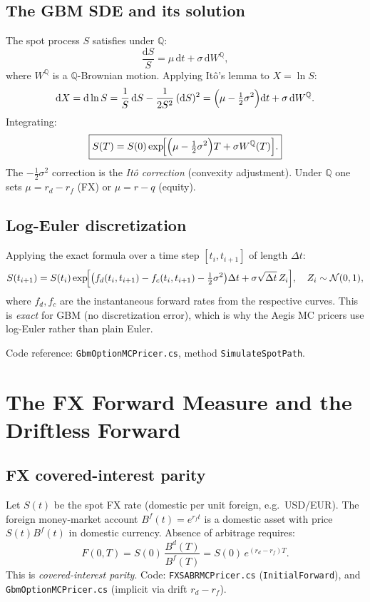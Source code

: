 \documentclass[11pt,a4paper]{article}
\newcommand{\dd}{\mathrm{d}}
\newcommand{\Q}{\mathbb{Q}}
\newcommand{\N}{\mathcal{N}}
\newcommand{\coderef}[1]{\texttt{\color{blue!60!black}#1}}
\theoremstyle{definition}
\begin{document}
\subsection{The GBM SDE and its solution}

The spot process $S$ satisfies under $\Q$:
\[
  \frac{\dd S}{S} = \mu\,\dd t + \sigma\,\dd W^\Q,
\]
where $W^\Q$ is a $\Q$-Brownian motion.  Applying It\^{o}'s lemma to
$X=\ln S$:
\[
  \dd X = \dd\ln S = \frac{1}{S}\,\dd S - \frac{1}{2S^2}\,(\dd S)^2
  = \Bigl(\mu - \tfrac{1}{2}\sigma^2\Bigr)\dd t + \sigma\,\dd W^\Q.
\]
Integrating:
\[
  \boxed{S(T) = S(0)\exp\!\Bigl[\Bigl(\mu-\tfrac{1}{2}\sigma^2\Bigr)T + \sigma W^\Q(T)\Bigr].}
\]
The $-\frac{1}{2}\sigma^2$ correction is the \emph{It\^{o} correction}
(convexity adjustment).  Under $\Q$ one sets $\mu = r_d - r_f$ (FX) or
$\mu = r - q$ (equity).

\subsection{Log-Euler discretization}

Applying the exact formula over a time step $[t_i,t_{i+1}]$ of length
$\Delta t$:
\[
  S(t_{i+1}) = S(t_i)\exp\!\Bigl[\bigl(f_d(t_i,t_{i+1})-f_c(t_i,t_{i+1})-\tfrac{1}{2}\sigma^2\bigr)\Delta t
  + \sigma\sqrt{\Delta t}\,Z_i\Bigr],
  \quad Z_i\sim\N(0,1),
\]
where $f_d,f_c$ are the instantaneous forward rates from the respective curves.
This is \emph{exact} for GBM (no discretization error), which is why the
Aegis MC pricers use log-Euler rather than plain Euler.

Code reference: \coderef{GbmOptionMCPricer.cs}, method
\texttt{SimulateSpotPath}.

\section{The FX Forward Measure and the Driftless Forward}
\label{sec:fx_forward}

\subsection{FX covered-interest parity}

Let $S(t)$ be the spot FX rate (domestic per unit foreign, e.g.\ USD/EUR).
The foreign money-market account $B^f(t)=e^{r_f t}$ is a domestic asset with
price $S(t)B^f(t)$ in domestic currency.  Absence of arbitrage requires:
\[
  F(0,T) = S(0)\,\frac{B^d(T)}{B^f(T)} = S(0)\,e^{(r_d-r_f)T}.
\]
This is \emph{covered-interest parity}.  Code:
\coderef{FXSABRMCPricer.cs} (\texttt{InitialForward}), and
\coderef{GbmOptionMCPricer.cs} (implicit via drift $r_d - r_f$).
\end{document}
